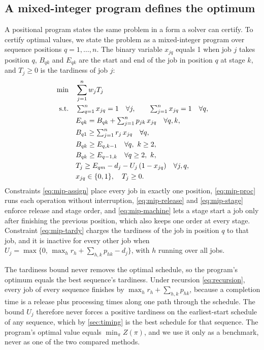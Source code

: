 \subsection{A mixed-integer program defines the optimum}\label{sec:mip}

\sumpara A positional program states the same problem in a form a solver can certify. \sumparaend
\fin To certify optimal values, we state the problem as a mixed-integer program over sequence positions $q = 1, \ldots, n$. \fine
\fin The binary variable $x_{jq}$ equals 1 when job $j$ takes position $q$, $B_{qk}$ and $E_{qk}$ are the start and end of the job in position $q$ at stage $k$, and $T_j \geq 0$ is the tardiness of job $j$: \fine
\begin{align}
\min \quad & \sum_{j=1}^{n} w_j T_j \label{eq:mip-obj}\\
\text{s.t.} \quad & \textstyle\sum_{q=1}^{n} x_{jq} = 1 \quad \forall j, \qquad \sum_{j=1}^{n} x_{jq} = 1 \quad \forall q, \label{eq:mip-assign}\\
& E_{qk} = B_{qk} + \textstyle\sum_{j=1}^{n} p_{jk}\, x_{jq} \quad \forall q, k, \label{eq:mip-proc}\\
& B_{q1} \geq \textstyle\sum_{j=1}^{n} r_j\, x_{jq} \quad \forall q, \label{eq:mip-release}\\
& B_{qk} \geq E_{q,k-1} \quad \forall q,\ k \geq 2, \label{eq:mip-stage}\\
& B_{qk} \geq E_{q-1,k} \quad \forall q \geq 2,\ k, \label{eq:mip-machine}\\
& T_j \geq E_{qm} - d_j - U_j\,(1 - x_{jq}) \quad \forall j, q, \label{eq:mip-tardy}\\
& x_{jq} \in \{0,1\}, \quad T_j \geq 0. \notag
\end{align}
\fin Constraints \eqref{eq:mip-assign} place every job in exactly one position, \eqref{eq:mip-proc} runs each operation without interruption, \eqref{eq:mip-release} and \eqref{eq:mip-stage} enforce release and stage order, and \eqref{eq:mip-machine} lets a stage start a job only after finishing the previous position, which also keeps one order at every stage. \fine
\fin Constraint \eqref{eq:mip-tardy} charges the tardiness of the job in position $q$ to that job, and it is inactive for every other job when $U_j = \max\{0,\, \max_h r_h + \sum_{h,k} p_{hk} - d_j\}$, with $h$ running over all jobs. \fine

\sumpara The tardiness bound never removes the optimal schedule, so the program's optimum equals the best sequence's tardiness. \sumparaend
\fin Under recursion \eqref{eq:recursion}, every job of every sequence finishes by $\max_h r_h + \sum_{h,k} p_{hk}$, because a completion time is a release plus processing times along one path through the schedule. \fine
\fin The bound $U_j$ therefore never forces a positive tardiness on the earliest-start schedule of any sequence, which by \cref{sec:timing} is the best schedule for that sequence. \fine
\fin The program's optimal value equals $\min_\pi Z(\pi)$, and we use it only as a benchmark, never as one of the two compared methods. \fine

